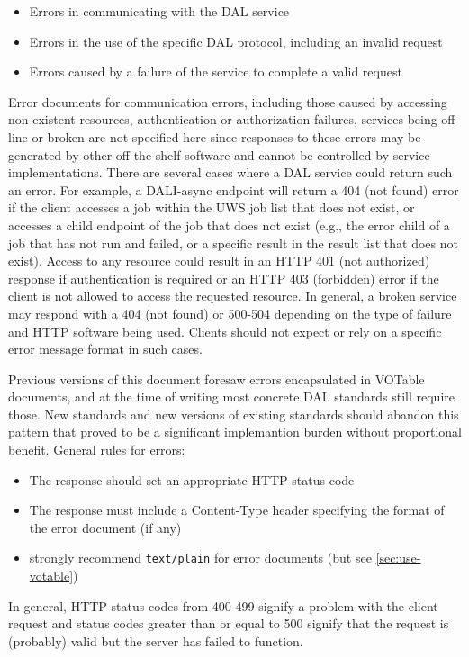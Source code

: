 \documentclass[11pt,letter]{ivoa}
\begin{document}
\begin{itemize}
\item Errors in communicating with the DAL service

\item Errors in the use of the specific DAL protocol, including an invalid
request

\item Errors caused by a failure of the service to complete a valid request
\end{itemize}

Error documents for communication errors, including those caused by accessing
non-existent resources, authentication or authorization failures, services being
off-line or broken are not specified here since responses to these errors may be
generated by other off-the-shelf software and cannot be controlled by service
implementations. There are several cases where a DAL service could return such
an error. For example, a DALI-async endpoint will return a 404 (not found) error if
the client accesses a job within the UWS job list that does not exist, or
accesses a child endpoint of the job that does not exist (e.g., the error
child of a job that has not run and failed, or a specific result in
the result list  that does not exist). Access to any resource could result
in an HTTP 401 (not authorized) response if authentication is required or an
HTTP 403 (forbidden) error if the client is not allowed to access the requested
resource. In general, a broken service may respond with a 404 (not found) or 500-504
depending on the type of failure and HTTP software being used. Clients should not
expect or rely on a specific error message format in such cases.

Previous versions of this document foresaw errors encapsulated in VOTable documents,
and at the time of writing most concrete DAL standards still require those. New
standards and new versions of existing standards should abandon this pattern that
proved to be a significant implemantion burden without proportional benefit. General
rules for errors:
\begin{itemize}
\item The response should set an appropriate HTTP status code
\item The response must include a Content-Type header specifying the format of the error document (if any)
\item strongly recommend \verb|text/plain| for error documents (but see \ref{sec:use-votable})
\end{itemize}
In general, HTTP status codes from 400-499 signify a problem with the
client request and status codes greater than or equal to 500 signify that the
request is (probably) valid but the server has failed to function.
\end{document}
